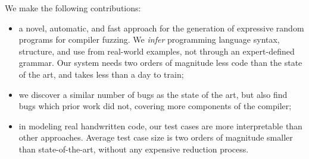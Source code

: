 %
%

We make the following contributions:
%
\begin{itemize}
\item a novel, automatic, and fast approach for the generation of expressive random programs for compiler fuzzing. We \emph{infer} programming language syntax, structure, and use from real-world examples, not through an expert-defined grammar. Our system needs two orders of magnitude less code than the state of the art, and takes less than a day to train; %

\item we discover a similar number of bugs as the state of the art, but also find bugs which prior work did not, covering more components of the compiler;

\item in modeling real handwritten code, our test cases are more interpretable than other approaches. Average test case size is two orders of magnitude smaller than state-of-the-art, without any expensive reduction process.
\end{itemize}
